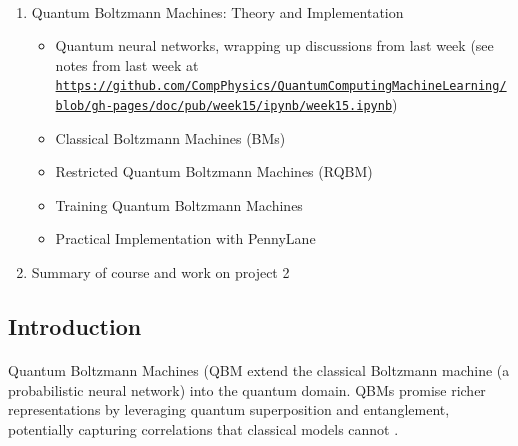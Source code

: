 \documentclass[%
oneside,                 %
final,                   %
10pt]{article}
\begin{document}
\paragraph{}
\begin{enumerate}
\item Quantum Boltzmann Machines: Theory and Implementation
\begin{itemize}

  \item Quantum neural networks, wrapping up discussions from last week (see notes from last week at \href{{https://github.com/CompPhysics/QuantumComputingMachineLearning/blob/gh-pages/doc/pub/week15/ipynb/week15.ipynb}}{\nolinkurl{https://github.com/CompPhysics/QuantumComputingMachineLearning/blob/gh-pages/doc/pub/week15/ipynb/week15.ipynb}})

  \item Classical Boltzmann  Machines (BMs)

  \item Restricted Quantum Boltzmann Machines (RQBM)

  \item Training Quantum Boltzmann Machines

  \item Practical Implementation with PennyLane

\end{itemize}

\noindent
\item Summary of course and work on  project 2
\end{enumerate}

\noindent



\subsection*{Introduction}


\paragraph{}
Quantum Boltzmann Machines (QBM extend the
classical Boltzmann machine (a probabilistic neural network) into the
quantum domain. QBMs promise richer representations by leveraging
quantum superposition and entanglement, potentially capturing
correlations that classical models cannot .
\end{document}
